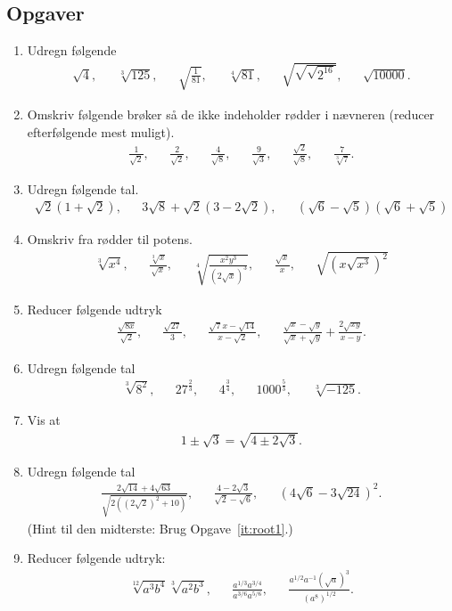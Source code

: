 \subsection{Opgaver}

\begin{enumerate}
\item Udregn følgende 
\begin{align*}
\sqrt{4},&& \sqrt[3]{125},&& \sqrt{ \frac{1}{81}},&& \sqrt[4]{81},&& \sqrt{\sqrt{\sqrt{2^{16}}}}, &&\sqrt{10000}.
\end{align*}
\item Omskriv følgende brøker så de ikke indeholder rødder i nævneren (reducer efterfølgende mest muligt).
\begin{align*}
\frac{1}{\sqrt{2}},&& \frac{2}{\sqrt{2}},&& \frac{4}{\sqrt{8}},&& \frac{9}{\sqrt{3}},&& \frac{\sqrt{2}}{\sqrt{8}},&& \frac{7}{\sqrt[3]{7}}.
\end{align*}

\item Udregn følgende tal.
\begin{align*}
\sqrt{2}(1+\sqrt{2}),&& 3\sqrt{8}+\sqrt{2}(3-2\sqrt{2}),&& (\sqrt{6}-\sqrt{5})(\sqrt{6}+\sqrt{5})
\end{align*}

\item Omskriv fra rødder til potens.
\begin{align*}
\sqrt[3]{x^4},&& \frac{\sqrt[3]{x}}{\sqrt{x}} ,&& \sqrt[4]{\frac{x^2y^3}{(2\sqrt{x})^3}},&& \frac{\sqrt{x}}{x},&& \sqrt{(x\sqrt{x^3})^{2}}
\end{align*}


\item Reducer følgende udtryk
\begin{align*}
\frac{\sqrt{8x}}{\sqrt{2}},&& \frac{\sqrt{27}}{3},&&\frac{\sqrt{7}x-\sqrt{14}}{x-\sqrt{2}},&& \frac{\sqrt{x}-\sqrt{y}}{\sqrt{x}+\sqrt{y}}+\frac{2\sqrt{xy}}{x-y}.
\end{align*}


\item Udregn følgende tal
\begin{align*}
\sqrt[3]{8^2},&& 27^{ \frac{2}{3}},&& 4^{ \frac{3}{4}},&& 1000^{ \frac{5}{3}},&& \sqrt[3]{-125}.
\end{align*}

\item\label{it:root1} Vis at 
\begin{align*}
1\pm\sqrt{3}=\sqrt{4\pm2\sqrt{3}}.
\end{align*}


\item Udregn følgende tal
\begin{align*}
\frac{2\sqrt{14}+4\sqrt{63}}{\sqrt{2( (2\sqrt{2})^2+10) }},&& \frac{4-2\sqrt{3}}{\sqrt{2}-\sqrt{6}},&& (4\sqrt{6}-3\sqrt{24})^2.
\end{align*}
(Hint til den midterste: Brug Opgave~\ref{it:root1}.) 
\item Reducer følgende udtryk:
\begin{align*}
\sqrt[12]{a^3b^4}\sqrt[3]{a^2b^3},&& \frac{a^{1/3}a^{3/4}}{a^{3/6}a^{5/6}},&& \frac{a^{1/2}a^{-1}(\sqrt{a})^3}{(a^8)^{1/2}}.
\end{align*}
\end{enumerate}